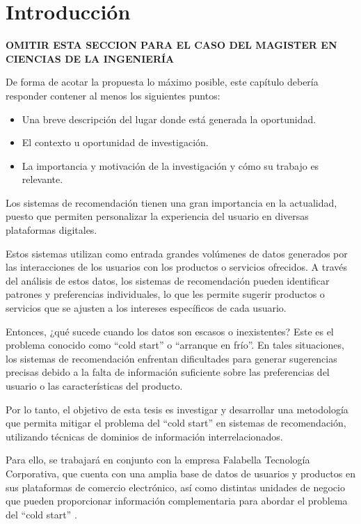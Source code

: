 \chapter{Introducción} %
\label{sec:Introduccion} %

\textbf{OMITIR ESTA SECCION PARA EL CASO DEL MAGISTER EN CIENCIAS DE LA INGENIER\'IA}

De forma de acotar la propuesta lo máximo posible, este capítulo debería responder contener al menos los siguientes puntos:
\begin{itemize}
\item Una breve descripción del lugar donde está generada la oportunidad.
\item El contexto u oportunidad de investigación.
\item La importancia y motivación de la investigación y cómo su trabajo es relevante.
\end{itemize}

\newpage
Los sistemas de recomendación tienen una gran importancia en la actualidad, puesto que permiten personalizar la experiencia del usuario en diversas plataformas digitales. 

Estos sistemas utilizan como entrada grandes volúmenes de datos generados por las interacciones de los usuarios con los productos o servicios ofrecidos. A través del análisis de estos datos, los sistemas de recomendación pueden identificar patrones y preferencias individuales, lo que les permite sugerir productos o servicios que se ajusten a los intereses específicos de cada usuario.

Entonces, ¿qué sucede cuando los datos son escasos o inexistentes? Este es el problema conocido como \enquote{cold start} o \enquote{arranque en frío}. En tales situaciones, los sistemas de recomendación enfrentan dificultades para generar sugerencias precisas debido a la falta de información suficiente sobre las preferencias del usuario o las características del producto.

Por lo tanto, el objetivo de esta tesis es investigar y desarrollar una metodología que permita mitigar el problema del \enquote{cold start} en sistemas de recomendación, utilizando técnicas de dominios de información interrelacionados.

Para ello, se trabajará en conjunto con la empresa Falabella Tecnología Corporativa, que cuenta con una amplia base de datos de usuarios y productos en sus plataformas de comercio electrónico, así como distintas unidades de negocio que pueden proporcionar información complementaria para abordar el problema del \enquote{cold start} \cite{L__2012}.